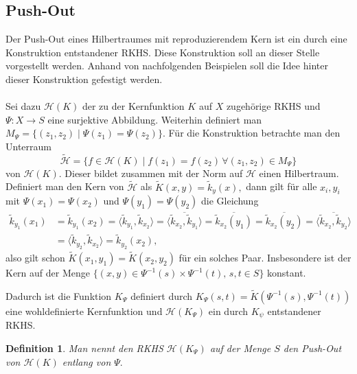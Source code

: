 \documentclass[12pt,titlepage,twoside,cleardoublepage]{article}
\theoremstyle{nummermitklammern}
\newtheorem{definition}[temp]{Definition}
\newtheorem{definition}[zahl]{Definition}
\numberwithin{equation}{section}
\begin{document}
\subsection{Push-Out}    
Der Push-Out eines Hilbertraumes mit reproduzierendem Kern ist ein durch eine Konstruktion  entstandener RKHS. Diese Konstruktion soll an dieser Stelle vorgestellt werden. Anhand von nachfolgenden Beispielen soll die Idee hinter dieser Konstruktion gefestigt werden.\\\\  
Sei dazu $\mathcal{H}(K)$ der zu der Kernfunktion $K$ auf $X$ zugehörige RKHS und $\Psi:X\to S$ eine surjektive Abbildung. Weiterhin definiert man $M_\Psi=\{(z_1,z_2)\mid \Psi(z_1)=\Psi(z_2)\}.$ Für die Konstruktion betrachte man den Unterraum 
\[
\tilde{\mathcal{H}}=\{f\in \mathcal{H}(K)\mid  f(z_1)=f(z_2)\,\forall (z_1,z_2)\in M_\Psi\}
\] von $\mathcal{H}(K).$ Dieser bildet zusammen mit der Norm auf $\mathcal{H}$ einen Hilbertraum. Definiert man den Kern von $\tilde{\mathcal{H}}$ als $\tilde{K}(x,y)=\tilde{k}_{y}(x),$ dann gilt für alle $x_i,y_i$ mit $\Psi(x_1)=\Psi(x_2)$ und $\Psi(y_1)=\Psi(y_2)$ die Gleichung
\begin{align*}
\tilde{k}_{y_1}(x_1)&=\tilde{k}_{y_1}(x_2)=\langle\tilde{k}_{y_1},\tilde{k}_{x_2}\rangle=\overline{\langle\tilde{k}_{x_2},\tilde{k}_{y_1}\rangle}=\overline{\tilde{k}_{x_2}(y_1)}=\overline{\tilde{k}_{x_2}(y_2)}=\overline{\langle\tilde{k}_{x_2},\tilde{k}_{y_2}\rangle}\\
&=\langle \tilde{k}_{y_2},\tilde{k}_{x_2}\rangle=\tilde{k}_{y_2}(x_2),
\end{align*} 
 also gilt schon  $\tilde{K}(x_1,y_1)=\tilde{K}(x_2,y_2)$ für ein solches Paar.
Insbesondere ist der Kern auf der Menge $\{(x,y)\in \Psi^{-1}(s)\times \Psi^{-1}(t),\,s,t \in S\}$ konstant.

Dadurch ist die Funktion $K_{\Psi}$ definiert durch $K_{\Psi}(s,t)=\tilde{K}(\Psi^{-1}(s),\Psi^{-1}(t))$ eine wohldefinierte Kernfunktion und $\mathcal{H}(K_{\Psi})$ ein durch $K_{\psi}$ entstandener RKHS.
\begin{definition}
Man nennt den RKHS $\mathcal{H}(K_{\Psi})$ auf der Menge $S$ den \emph{Push-Out} von $\mathcal{H}(K)$ entlang von $\Psi.$ 
\end{definition}
\end{document}
